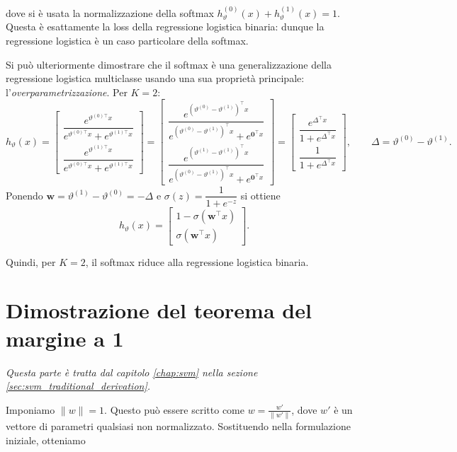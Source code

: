 dove si è usata la normalizzazione della softmax $h_{\vartheta}^{(0)}(x)+h_{\vartheta}^{(1)}(x)=1$.
Questa è esattamente la loss della regressione logistica binaria: dunque la regressione logistica è un caso particolare della softmax.

Si può ulteriormente dimostrare che il softmax è una generalizzazione della regressione logistica multiclasse usando una sua proprietà principale: l'\emph{overparametrizzazione}. Per $K=2$:
\[
h_{\vartheta}(x)=
\begin{bmatrix}
\dfrac{e^{\vartheta^{(0)\!\top}x}}{e^{\vartheta^{(0)\!\top}x}+e^{\vartheta^{(1)\!\top}x}}\\[6pt]
\dfrac{e^{\vartheta^{(1)\!\top}x}}{e^{\vartheta^{(0)\!\top}x}+e^{\vartheta^{(1)\!\top}x}}
\end{bmatrix}
=
\begin{bmatrix}
\dfrac{e^{(\vartheta^{(0)}-\vartheta^{(1)})^\top x}}{e^{(\vartheta^{(0)}-\vartheta^{(1)})^\top x}+e^{\mathbf 0^\top x}}\\[6pt]
\dfrac{e^{(\vartheta^{(1)}-\vartheta^{(1)})^\top x}}{e^{(\vartheta^{(0)}-\vartheta^{(1)})^\top x}+e^{\mathbf 0^\top x}}
\end{bmatrix}
=
\begin{bmatrix}
\dfrac{e^{\Delta^\top x}}{1+e^{\Delta^\top x}}\\[6pt]
\dfrac{1}{1+e^{\Delta^\top x}}
\end{bmatrix},
\qquad \Delta=\vartheta^{(0)}-\vartheta^{(1)}.
\]
Ponendo \(\mathbf w=\vartheta^{(1)}-\vartheta^{(0)}=-\Delta\) e
\(\sigma(z)=\dfrac{1}{1+e^{-z}}\) si ottiene
\[
h_{\vartheta}(x)=
\begin{bmatrix}
1-\sigma(\mathbf w^\top x)\\[4pt]
\sigma(\mathbf w^\top x)
\end{bmatrix}.
\]

\noindent
Quindi, per $K=2$, il softmax riduce alla regressione logistica binaria.

\section{Dimostrazione del teorema del margine a 1}\label{sec:teorema_margine_1}
\textit{Questa parte è tratta dal capitolo \ref{chap:svm} nella sezione \ref{sec:svm_traditional_derivation}.}

\bigskip
\noindent
Imponiamo $\|w\| = 1$. Questo può essere scritto come $ \displaystyle w = \frac{w'}{\|w'\|}$, dove $w'$ è un vettore di parametri qualsiasi non normalizzato. Sostituendo nella formulazione iniziale, otteniamo

